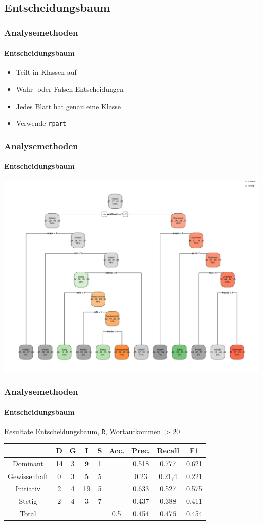 \subsection{Entscheidungsbaum}
\begin{frame}
\frametitle{Analysemethoden}
\framesubtitle{Entscheidungsbaum}
\begin{itemize}\setlength\parskip{12pt}
\item Teilt in Klassen auf
\item Wahr- oder Falsch-Entscheidungen
\item Jedes Blatt hat genau eine Klasse
\item Verwende \texttt{rpart}
\end{itemize}
\end{frame}

\begin{frame}
\frametitle{Analysemethoden}
\framesubtitle{Entscheidungsbaum}
\begin{center}
	\includegraphics[scale=0.5]{RPlot.pdf}
\end{center}

\end{frame}
\begin{frame}
\frametitle{Analysemethoden}
\framesubtitle{Entscheidungsbaum}
Resultate Entscheidungsbaum, \texttt{R}, Wortaufkommen $> 20$
\begin{center}
\begin{tabular}{|c|c|c|c|c|c|c|c|c|}
\hline
 &  D 	& G	& I & S	& Acc.	& Prec. & Recall	& F1\\
\hline
Dominant & 14 & 3 & 9 & 1 & & 0.518 & 0.777 & 0.621 \\
Gewissenhaft & 0 & 3 & 5 & 5& &0.23 & 0.21,4 & 0.221\\
Initiativ & 2 & 4 & 19 & 5& & 0.633& 0.527 & 0.575\\
Stetig & 2 & 4 & 3 & 7& &0.437 & 0.388& 0.411 \\
\hline
Total 	&		&		& & 		& 0.5	& 0.454& 0.476 & 0.454\\
\hline
\end{tabular}
\end{center}
\end{frame}
